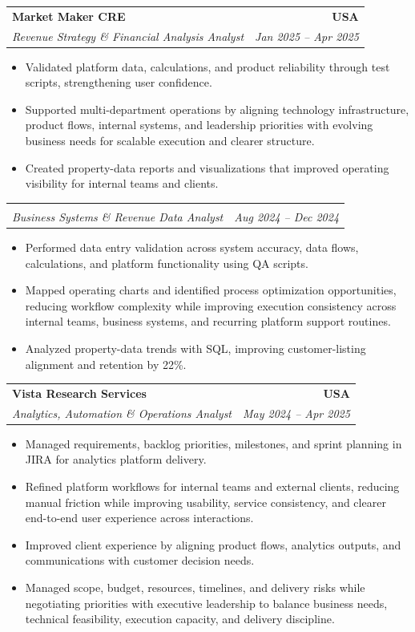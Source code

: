 \documentclass[letterpaper,10pt]{article}
\makeatletter
\newcommand{\resumeItem}[1]{\item \small{#1}}
\newcommand{\resumeSubheading}[4]{
  \vspace{1pt}\item
    \begin{tabular*}{1.0\textwidth}[t]{l@{\extracolsep{\fill}}r}
      \textbf{#1} & \textbf{\small #2} \\
      \textit{\small #3} & \textit{\small #4} \\
    \end{tabular*}\vspace{-6pt}
}
\newcommand{\resumeItemListStart}{\begin{itemize}[leftmargin=0.15in, itemsep=1pt, topsep=3pt]}
\newcommand{\resumeItemListEnd}{\end{itemize}\vspace{-2pt}}
\makeatother
\begin{document}
\vspace{-2pt}

\resumeSubheading
{Market Maker CRE}{USA}
{Revenue Strategy \& Financial Analysis Analyst}{Jan 2025 -- Apr 2025}
\resumeItemListStart
\resumeItem{Validated platform data, calculations, and product reliability through test scripts, strengthening user confidence.}
\resumeItem{Supported multi-department operations by aligning technology infrastructure, product flows, internal systems, and leadership priorities with evolving business needs for scalable execution and clearer structure.}
\resumeItem{Created property-data reports and visualizations that improved operating visibility for internal teams and clients.}
\resumeItemListEnd

\vspace{-12pt}

\resumeSubheading
{}{}
{Business Systems \& Revenue Data Analyst}{Aug 2024 -- Dec 2024}
\resumeItemListStart
\resumeItem{Performed data entry validation across system accuracy, data flows, calculations, and platform functionality using QA scripts.}
\resumeItem{Mapped operating charts and identified process optimization opportunities, reducing workflow complexity while improving execution consistency across internal teams, business systems, and recurring platform support routines.}
\resumeItem{Analyzed property-data trends with SQL, improving customer-listing alignment and retention by 22\%.}
\resumeItemListEnd

\vspace{-2pt}

\resumeSubheading
{Vista Research Services}{USA}
{Analytics, Automation \& Operations Analyst}{May 2024 -- Apr 2025}
\resumeItemListStart
\resumeItem{Managed requirements, backlog priorities, milestones, and sprint planning in JIRA for analytics platform delivery.}
\resumeItem{Refined platform workflows for internal teams and external clients, reducing manual friction while improving usability, service consistency, and clearer end-to-end user experience across interactions.}
\resumeItem{Improved client experience by aligning product flows, analytics outputs, and communications with customer decision needs.}
\resumeItem{Managed scope, budget, resources, timelines, and delivery risks while negotiating priorities with executive leadership to balance business needs, technical feasibility, execution capacity, and delivery discipline.}
\resumeItemListEnd

\vspace{-2pt}
\end{document}
